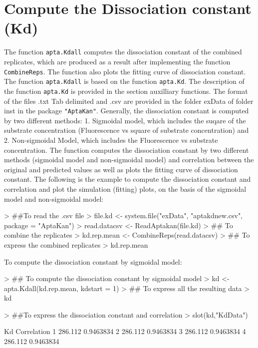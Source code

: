 \documentclass[11pt]{article}
\newcommand{\code}[1]{{\tt #1}}
\newcommand{\pkg}[1]{{\tt "#1"}}
\begin{document}
\section{Compute the Dissociation constant (Kd)}
The function \code{apta.Kdall} computes the dissociation constant of the combined replicates, which are
produced as a result after implementing the function \code{CombineReps}. The function also plots the
fitting curve of dissociation constant. The function \code{apta.Kdall} is based on the function
\code{apta.Kd}. The description of the function \code{apta.Kd} is provided in the section auxilliary
functions. The format of the files .txt Tab delimited and .csv are provided in the folder exData
of folder inst in the package \pkg{AptaKan}. Generally, the dissociation constant is computed by two
different methods: 1. Sigmoidal model, which includes the suqare of the substrate concentration
(Fluorescence vs square of substrate concentration) and 2. Non-sigmoidal Model, which includes the
Fluorescence vs substrate concentration. The function computes the dissociation constant by two different methods (sigmoidal model and non-sigmoidal model) and correlation between the original and predicted values as well as plots the fitting curve of dissociation constant. The following is the example to compute the dissociation constant and correlation and plot the simulation (fitting) plots, on the basis of the sigmoidal model and non-sigmoidal model:

\begin{Schunk}
\begin{Sinput}
> ##To read the .csv file
> file.kd <- system.file("exData", "aptakdnew.csv", package = "AptaKan")
> read.datacsv <- ReadAptakan(file.kd)
> ## To combine the replicates
> kd.rep.mean <- CombineReps(read.datacsv)
> ## To express the combined replicates
> kd.rep.mean
\end{Sinput}
\end{Schunk}

To compute the dissociation constant by sigmoidal model:
\begin{Schunk}
\begin{Sinput}
> ## To compute the dissociation constant by sigmoidal model
> kd <- apta.Kdall(kd.rep.mean, kdstart = 1)
> ## To express all the resulting data
> kd
\end{Sinput}
\end{Schunk}

\begin{Schunk}
\begin{Sinput}
> ##To express the dissociation constant and correlation
> slot(kd,"KdData")
\end{Sinput}
\begin{Soutput}
       Kd Correlation
1 286.112   0.9463834
2 286.112   0.9463834
3 286.112   0.9463834
4 286.112   0.9463834
\end{Soutput}
\end{Schunk}
\end{document}
